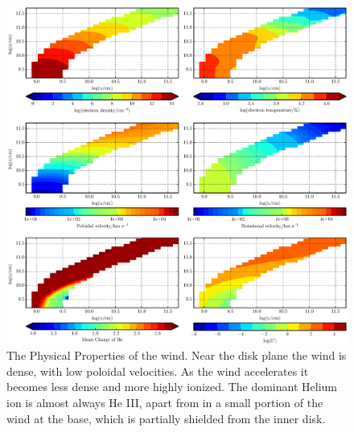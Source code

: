 \documentclass[preprint, a4paper, 11pt]{aastex}
\begin{document}




\begin{figure} %
\includegraphics[width=\textwidth]{figures/fig5.eps}
\caption{
The Physical Properties of the wind. Near
the disk plane the wind is dense, with low poloidal velocities.
As the wind accelerates it becomes less dense
and more highly ionized. The dominant Helium ion
is almost always He III, apart from in a small
portion of the wind at the base, which is partially shielded
from the inner disk.
}
\label{wind}
\end{figure} %






\end{document}
